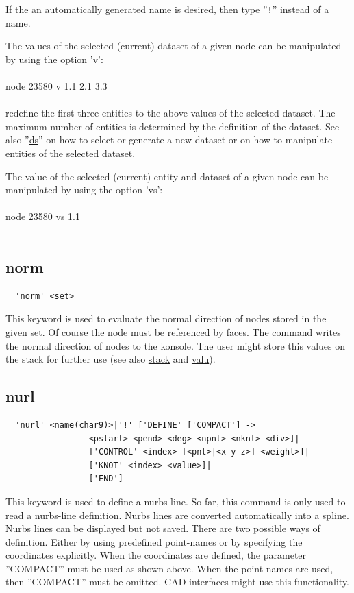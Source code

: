 \documentclass{article}
\providecommand{\htmlref}[2]{\hyperref[#2]{#1}}
\begin{document}
If the an automatically generated name is desired, then type ''\verb_!_'' instead of a name.

The values of the selected (current) dataset of a given node can be manipulated by using the option 'v':\\\\
node 23580 v 1.1 2.1 3.3\\\\
redefine the first three entities to the above values of the selected dataset. The maximum number of entities is determined by the definition of the dataset. See also ''\htmlref{ds}{ds}'' on how to select or generate a new dataset or on how to manipulate entities of the selected dataset.

The value of the selected (current) entity and dataset of a given node can be manipulated by using the option 'vs':\\\\
node 23580 vs 1.1\\\\


\subsection{\label{norm}norm}
\begin{verbatim}
  'norm' <set> 
\end{verbatim}
This keyword is used to evaluate the normal direction of nodes stored in the given set. Of course the node must be referenced by faces. The command writes the normal direction of nodes to the konsole. The user might store this values on the stack for further use (see also \htmlref{stack}{stack} and \htmlref{valu}{valu}). 

\subsection{\label{nurl}nurl}
\begin{verbatim}
  'nurl' <name(char9)>|'!' ['DEFINE' ['COMPACT'] ->
                 <pstart> <pend> <deg> <npnt> <nknt> <div>]|
                 ['CONTROL' <index> [<pnt>|<x y z>] <weight>]|
                 ['KNOT' <index> <value>]|
                 ['END']
\end{verbatim}
This keyword is used to define a nurbs line. So far, this command is only used to read a nurbs-line definition. Nurbs lines are converted automatically into a spline. Nurbs lines can be displayed but not saved. There are two possible ways of definition. Either by using predefined point-names or by specifying the coordinates explicitly. When the coordinates are defined, the parameter ''COMPACT'' must be used as shown above. When the point names are used, then ''COMPACT'' must be omitted. CAD-interfaces might use this functionality.
\end{document}
